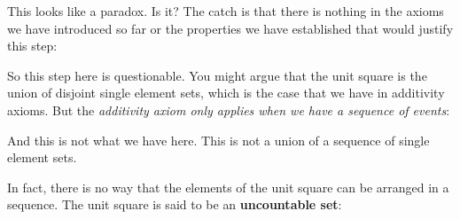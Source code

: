 \documentclass[pdftex, brazil, 12pt, twoside]{article}
\begin{document}
This looks like a paradox.
Is it?
The catch is that there is nothing in the axioms we have
introduced so far or the properties we have established
that would justify this step:

\begin{figure}[H]
  \begin{center}
  \end{center}
\end{figure}

So this step here is questionable.
You might argue that the unit square is the union of
disjoint single element sets, which is the case that we have
in additivity axioms.
But the \emph{additivity axiom only applies when we have a
sequence of events}:

\begin{figure}[H]
  \begin{center}
  \end{center}
\end{figure}

And this is not what we have here.
This is not a union of a sequence of
single element sets.

In fact, there is no way that the elements of the unit
square can be arranged in a sequence.
The unit square is said to be an \textbf{uncountable set}:

\begin{figure}[H]
  \begin{center}
  \end{center}
\end{figure}
\end{document}
